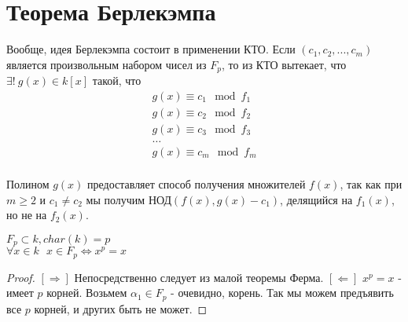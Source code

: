 \section{Теорема Берлекэмпа}

Вообще, идея Берлекэмпа состоит в применении КТО. Если $(c_1, c_2, ..., c_m)$ является произвольным набором чисел из $F_p$, то из КТО вытекает, что $\exists!~g(x) \in k[x]$
такой, что 
\[
\begin{array}{l}
g(x) \equiv c_1 \mod f_1 \\
g(x) \equiv c_2 \mod f_2 \\
g(x) \equiv c_3 \mod f_3 \\
\dots \\
g(x) \equiv c_m \mod f_m \\
\end{array}
\]

Полином $g(x)$ предоставляет способ получения множителей $f(x)$, так как при $m \geqslant 2$ и $c_1 \neq c_2$ мы получим
$\text{НОД}(f(x), g(x) - c_1)$, делящийся на $f_1(x)$, но не на $f_2(x)$.

\begin{lem}
$F_p \subset k, char(k) = p$ \\
$\forall x \in k~~~x \in F_p \Leftrightarrow x^p = x $
\end{lem}
\begin{proof}
  $ [\Rightarrow] $ Непосредственно следует из малой теоремы Ферма. \newline
  $ [\Leftarrow] $ $x^p = x$ - имеет $p$ корней. Возьмем $\alpha_1 \in F_p$ - очевидно, корень. Так мы можем предъявить
все $p$ корней, и других быть не может.
\end{proof}

